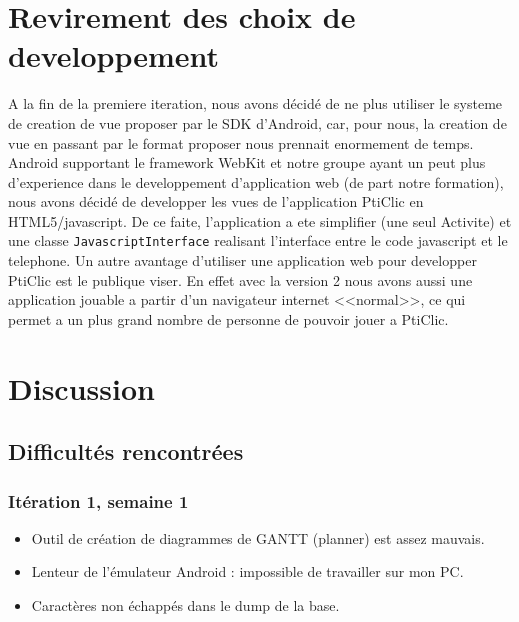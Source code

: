 \documentclass[a4paper,11pt,french]{article}
\def\android{Android\texttrademark{}}
\begin{document}
\section{Revirement des choix de developpement} %
A la fin de la premiere iteration, nous avons décidé de ne plus utiliser le systeme de creation de vue proposer par le SDK d'\android{}, car, pour nous, la creation de vue en passant par le format proposer nous prennait enormement de temps. \android{} supportant le framework WebKit et notre groupe ayant un peut plus d'experience dans le developpement d'application web (de part notre formation), nous avons décidé de developper les vues de l'application PtiClic en HTML5/javascript. De ce faite, l'application a ete simplifier (une seul Activite) et une classe \verb!JavascriptInterface! realisant l'interface entre le code javascript et le telephone.
Un autre avantage d'utiliser une application web pour developper PtiClic est le publique viser. En effet avec la version 2 nous avons aussi une application jouable a partir d'un navigateur internet <<normal>>, ce qui permet a un plus grand nombre de personne de pouvoir jouer a PtiClic.

\section{Discussion}
\subsection{Difficultés rencontrées}
\label{sec:difficultes}
\subsubsection{Itération 1, semaine 1}
\begin{itemize}
\item Outil de création de diagrammes de GANTT (planner) est assez mauvais.
\item Lenteur de l'émulateur \android{} : impossible de travailler sur mon PC.%
\item Caractères non échappés dans le dump de la base.%
\end{itemize}
\end{document}
